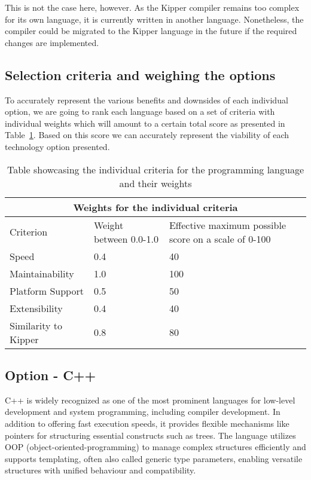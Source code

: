 This is not the case here, however. As the Kipper compiler remains too complex for its own language, it is currently written in another language. Nonetheless, the compiler could be migrated to the Kipper language in the future if the required changes are implemented.

\subsection{Selection criteria and weighing the options}
\label{sec:development-language-selection-criteria}

To accurately represent the various benefits and downsides of each individual option, we are going to rank each language based on a set of criteria with individual weights which will amount to a certain total score as presented in Table~\ref{tab:programming-language-criteria-weights}. Based on this score we can accurately represent the viability of each technology option presented.

\begin{table}[H]
	\centering
	\begin{tabular}{ |p{4cm}|p{5cm}|p{5cm}|  }
		\hline
		\multicolumn{3}{|c|}{Weights for the individual criteria} \\
		\hline
		Criterion&Weight between 0.0-1.0&Effective maximum possible score on a scale of 0-100\\
		\hline
		Speed&0.4&40\\
		Maintainability&1.0&100\\
		Platform Support&0.5&50\\
		Extensibility&0.4&40\\
		Similarity to Kipper&0.8&80\\
		\hline
	\end{tabular}
	\caption{Table showcasing the individual criteria for the programming language and their weights}
	\label{tab:programming-language-criteria-weights}
\end{table}

\subsection{Option - C++}
\label{sec:programming-language-option-c++}

C++ is widely recognized as one of the most prominent languages for low-level development and system programming, including compiler development. In addition to offering fast execution speeds, it provides flexible mechanisms like pointers for structuring essential constructs such as trees. The language utilizes OOP (\Gls{object-oriented-programming}) to manage complex structures efficiently and supports templating, often also called generic type parameters, enabling versatile structures with unified behaviour and compatibility.

